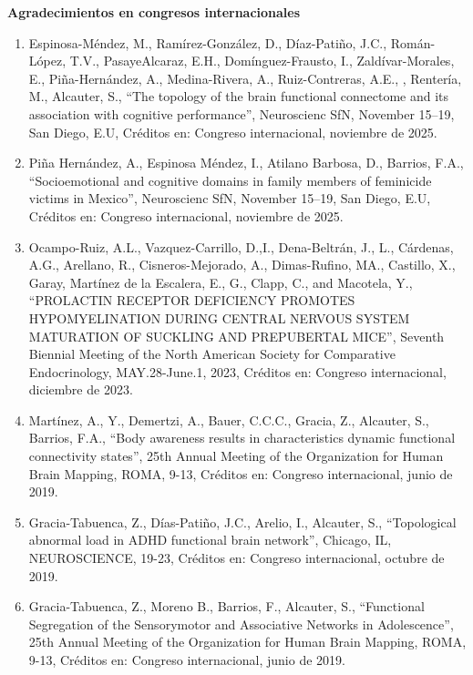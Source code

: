\textbf{Agradecimientos en congresos internacionales}

\begin{enumerate}
\item  Espinosa-Méndez, M., Ramírez-González, D., Díaz-Patiño, J.C., Román-López, T.V., PasayeAlcaraz, E.H., 
Domínguez-Frausto, 
I., Zaldívar-Morales, E., Piña-Hernández, A., Medina-Rivera, A., Ruiz-Contreras, A.E., , Rentería, M., Alcauter, S., “The 
topology of the brain functional connectome and its association with cognitive performance”, Neuroscienc SfN, November 15–19, 
San Diego, E.U, Créditos en: Congreso internacional, noviembre de 2025.

\item  Piña Hernández, A., Espinosa Méndez, I., Atilano Barbosa, D., Barrios, F.A., “Socioemotional and cognitive domains in 
family members of feminicide victims in Mexico”, Neuroscienc SfN, November 15–19, San Diego, E.U, Créditos en: Congreso 
internacional, noviembre de 2025.

\item  Ocampo-Ruiz, A.L., Vazquez-Carrillo, D.,I., Dena-Beltrán, J., L., Cárdenas, A.G., Arellano, R., Cisneros-Mejorado, A., 
Dimas-Rufino, MA., Castillo, X., Garay, Martínez de la Escalera, E., G., Clapp, C., and Macotela, Y., “PROLACTIN RECEPTOR 
DEFICIENCY PROMOTES HYPOMYELINATION DURING CENTRAL NERVOUS SYSTEM MATURATION OF SUCKLING AND PREPUBERTAL MICE”, Seventh 
Biennial Meeting of the North American Society for Comparative Endocrinology, MAY.28-June.1, 2023, Créditos en: Congreso 
internacional, diciembre de 2023.

\item  Martínez, A., Y., Demertzi, A., Bauer, C.C.C., Gracia, Z., Alcauter, S., Barrios, F.A., “Body awareness results in 
characteristics dynamic functional connectivity states”, 25th Annual Meeting of the Organization for Human Brain Mapping, 
ROMA, 9-13, Créditos en: Congreso internacional, junio de 2019.

\item  Gracia-Tabuenca, Z., Días-Patiño, J.C., Arelio, I., Alcauter, S., “Topological abnormal load in ADHD functional brain 
network”, Chicago, IL, NEUROSCIENCE, 19-23, Créditos en: Congreso internacional, octubre de 2019.

\item  Gracia-Tabuenca, Z., Moreno B., Barrios, F., Alcauter, S., “Functional Segregation of the Sensorymotor and Associative 
Networks in Adolescence”, 25th Annual Meeting of the Organization for Human Brain Mapping, ROMA, 9-13, Créditos en: Congreso 
internacional, junio de 2019.


\end{enumerate}
